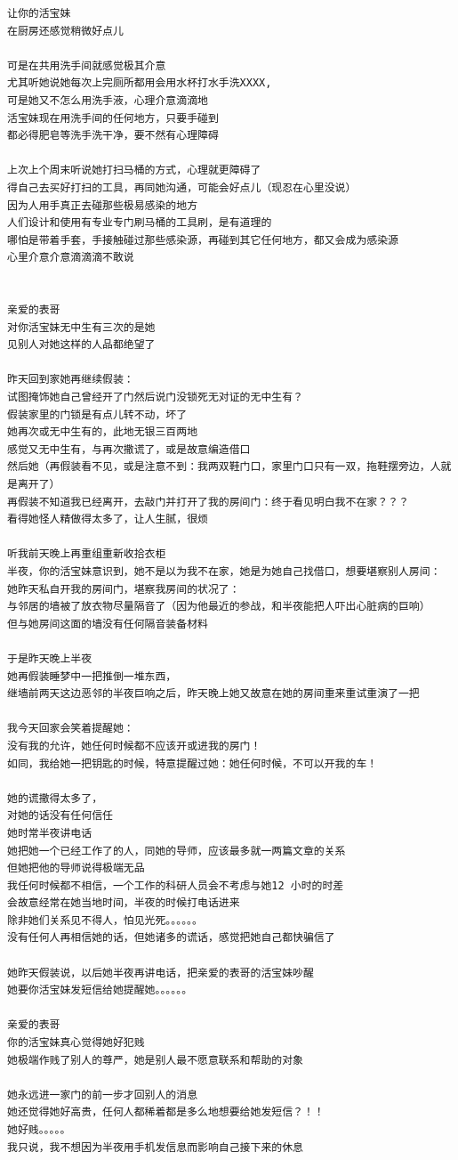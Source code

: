 \documentclass[9pt, b5paper]{article}
\begin{document}
\begin{enumerate}
\begin{verbatim}
让你的活宝妹
在厨房还感觉稍微好点儿

可是在共用洗手间就感觉极其介意
尤其听她说她每次上完厕所都用会用水杯打水手洗XXXX, 
可是她又不怎么用洗手液，心理介意滴滴地
活宝妹现在用洗手间的任何地方，只要手碰到
都必得肥皂等洗手洗干净，要不然有心理障碍

上次上个周末听说她打扫马桶的方式，心理就更障碍了
得自己去买好打扫的工具，再同她沟通，可能会好点儿（现忍在心里没说）
因为人用手真正去碰那些极易感染的地方
人们设计和使用有专业专门刷马桶的工具刷，是有道理的
哪怕是带着手套，手接触碰过那些感染源，再碰到其它任何地方，都又会成为感染源
心里介意介意滴滴滴不敢说


亲爱的表哥
对你活宝妹无中生有三次的是她
见别人对她这样的人品都绝望了

昨天回到家她再继续假装：
试图掩饰她自己曾经开了门然后说门没锁死无对证的无中生有？
假装家里的门锁是有点儿转不动，坏了
她再次或无中生有的，此地无银三百两地
感觉又无中生有，与再次撒谎了，或是故意编造借口
然后她（再假装看不见，或是注意不到：我两双鞋门口，家里门口只有一双，拖鞋摆旁边，人就是离开了）
再假装不知道我已经离开，去敲门并打开了我的房间门：终于看见明白我不在家？？？
看得她怪人精做得太多了，让人生腻，很烦

听我前天晚上再重组重新收拾衣柜
半夜，你的活宝妹意识到，她不是以为我不在家，她是为她自己找借口，想要堪察别人房间：
她昨天私自开我的房间门，堪察我房间的状况了：
与邻居的墙被了放衣物尽量隔音了（因为他最近的参战，和半夜能把人吓出心脏病的巨响）
但与她房间这面的墙没有任何隔音装备材料

于是昨天晚上半夜
她再假装睡梦中一把推倒一堆东西，
继墙前两天这边恶邻的半夜巨响之后，昨天晚上她又故意在她的房间重来重试重演了一把

我今天回家会笑着提醒她：
没有我的允许，她任何时候都不应该开或进我的房门！
如同，我给她一把钥匙的时候，特意提醒过她：她任何时候，不可以开我的车！

她的谎撒得太多了，
对她的话没有任何信任
她时常半夜讲电话
她把她一个已经工作了的人，同她的导师，应该最多就一两篇文章的关系
但她把他的导师说得极端无品
我任何时候都不相信，一个工作的科研人员会不考虑与她12 小时的时差
会故意经常在她当地时间，半夜的时候打电话进来
除非她们关系见不得人，怕见光死。。。。。。
没有任何人再相信她的话，但她诸多的谎话，感觉把她自己都快骗信了

她昨天假装说，以后她半夜再讲电话，把亲爱的表哥的活宝妹吵醒
她要你活宝妹发短信给她提醒她。。。。。。

亲爱的表哥
你的活宝妹真心觉得她好犯贱
她极端作贱了别人的尊严，她是别人最不愿意联系和帮助的对象

她永远进一家门的前一步才回别人的消息
她还觉得她好高贵，任何人都稀着都是多么地想要给她发短信？！！
她好贱。。。。。
我只说，我不想因为半夜用手机发信息而影响自己接下来的休息


\end{verbatim}
\end{enumerate}
\end{document}
